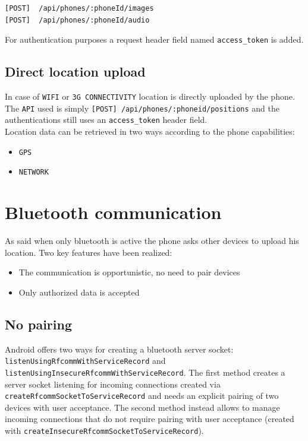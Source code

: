 \documentclass[conference, 11pt]{IEEEtran}
\begin{document}
\begin{lstlisting}[caption=REST API to upload images and audio]
[POST]	/api/phones/:phoneId/images
[POST] 	/api/phones/:phoneId/audio
\end{lstlisting}

For authentication purposes a request header field named \texttt{access\_token} is added.

\subsection{\textbf{Direct location upload}}
In case of \texttt{WIFI} or \texttt{3G CONNECTIVITY} location is directly uploaded by the phone. The \texttt{API} used is simply \texttt{[POST] /api/phones/:phoneid/positions} and the authentications still uses an \texttt{access\_token} header field.\\
Location data can be retrieved in two ways according to the phone capabilities:

\begin{itemize}
	\item \texttt{GPS}
	\item \texttt{NETWORK}
\end{itemize}

\section{\textbf{Bluetooth communication}}
As said when only bluetooth is active the phone asks other devices to upload his location. Two key features have been realized:

\begin{itemize}
	\item The communication is opportunistic, no need to pair devices
	\item Only authorized data is accepted
\end{itemize}

\subsection{\textbf{No pairing}}
Android offers two ways for creating a bluetooth server socket: \texttt{listen\allowbreak Using\allowbreak Rfcomm\allowbreak WithServiceRecord} and \texttt{listen\allowbreak Using\allowbreak Insecure\allowbreak RfcommWithServiceRecord}. The first method creates a server socket listening for incoming connections created via \texttt{create\allowbreak Rfcomm\allowbreak SocketToServiceRecord} and needs an explicit pairing of two devices with user acceptance. The second method instead allows to manage incoming connections that do not require pairing with user acceptance (created with \texttt{create\allowbreak Insecure\allowbreak Rfcomm\allowbreak SocketToServiceRecord}).\\
\end{document}
